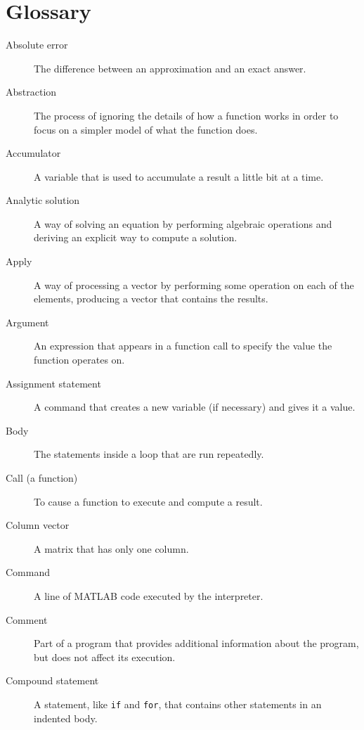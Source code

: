 

\chapter*{Glossary}

\begin{description}


\item[Absolute error] The difference between an approximation and
an exact answer.

\item[Abstraction] The process of ignoring the details of how
a function works in order to focus on a simpler model of what the
function does.

\item[Accumulator] A variable that is used to accumulate a result
a little bit at a time.

\item[Analytic solution] A way of solving an equation by performing
algebraic operations and deriving an explicit way to
compute a solution.

\item[Apply] A way of processing a vector by performing some operation
on each of the elements, producing a vector that contains the
results.

\item[Argument] An expression that appears in a function call to
specify the value the function operates on.

\item[Assignment statement] A command that creates a new variable
(if necessary) and gives it a value.

\item[Body] The statements inside a loop that are run
repeatedly.

\item[Call (a function)] To cause a function to execute and compute a result.

\item[Column vector] A matrix that has only one column.

\item[Command] A line of MATLAB code executed by the interpreter.

\item[Comment] Part of a program that provides additional information
about the program, but does not affect its execution.

\item[Compound statement] A statement, like \lstinline{if} and \lstinline{for}, that
contains other statements in an indented body.


\end{description}
